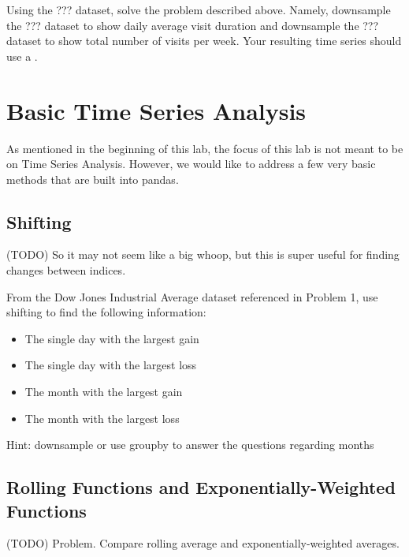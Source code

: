 \begin{problem}
Using the ??? dataset, solve the problem described above. Namely, downsample the ??? dataset to show daily average visit duration and downsample the ??? dataset to show total number of visits per week. Your resulting time series should use a .
\end{problem}

\section*{Basic Time Series Analysis}
As mentioned in the beginning of this lab, the focus of this lab is not meant to be on Time Series Analysis. However, we would like to address a few very basic methods that are built into pandas.

\subsection*{Shifting}

(TODO) So it may not seem like a big whoop, but this is super useful for finding changes between indices.

\begin{problem}
From the Dow Jones Industrial Average dataset referenced in Problem 1, use shifting to find the following information:
    \begin{itemize}
        \item The single day with the largest gain
        \item The single day with the largest loss
        \item The month with the largest gain
        \item The month with the largest loss
    \end{itemize}
Hint: downsample or use groupby to answer the questions regarding months
\end{problem}

\subsection*{Rolling Functions and Exponentially-Weighted Functions}

(TODO) Problem. Compare rolling average and exponentially-weighted averages.
